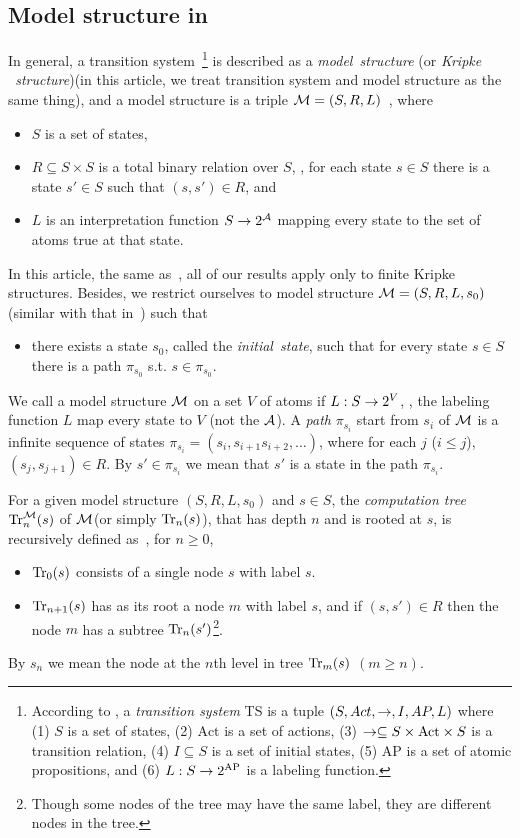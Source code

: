 \documentclass[letterpaper]{article} %
\begin{document}
\subsection{Model structure in \CTL}
 In general, a transition system~\footnote{According to \cite{Baier:PMC:2008},
a {\em transition system} TS is a tuple $(S, Act,\rightarrow,I, AP, L)$ where
(1) $S$ is a set of states,
(2) $\textrm{Act}$ is a set of actions,
(3) $\rightarrow\subseteq S\times \textrm{Act}\times S$ is a transition relation,
(4) $I\subseteq S$ is a set of initial states,
(5) $\textrm{AP}$ is a set of atomic propositions, and
(6) $L:S\rightarrow 2^{\textrm{AP}}$ is a labeling function.} is described as a \emph{model\ structure} (or \emph{Kripke \ structure})(in this article, we treat transition system and model structure as the same thing), and a model structure is a triple ${\cal M}=(S,R,L)$~\cite{emerson1990temporal}, where
\begin{itemize}
  \item $S$ is a set of states,
  \item $R\subseteq S\times S$ is a total binary relation over $S$, \ie, for each state $s\in S$ there is a state $s'\in S$ such that $(s,s')\in R$, and
  \item $L$ is an interpretation function $S\rightarrow 2^{\cal A}$ mapping every state to the set of atoms true at that state.
\end{itemize}
In this article, the same as~\cite{DBLP:journals/tcs/BrowneCG88}, all of our results apply only to finite Kripke structures.
Besides, we restrict ourselves to model structure ${\cal M}=(S,R,L,s_0)$ (similar with that in~\cite{zhang2009refined}) such that
\begin{itemize}
  \item there exists a state $s_0$, called the \emph{initial\ state}, such that for every state $s\in S$ there is a path $\pi_{s_0}$ s.t. $s\in \pi_{s_0}$.
\end{itemize}
We call a model structure ${\cal M}$ on a set $V$ of atoms if $L: S \rightarrow 2^V$, \ie, the labeling function $L$ map every state to $V$ (not the ${\cal A}$).  A \emph{path} $\pi_{s_i}$ start from $s_i$ of ${\cal M}$ is a infinite sequence of states $\pi_{s_i}=(s_i, s_{i+1} s_{i+2},\dots)$, where for each $j$ ($i\leq j$), $(s_j, s_{j+1}) \in R$. By $s'\in \pi_{s_i}$ we mean that $s'$ is a state in the path $\pi_{s_i}$.

For a given model structure $(S,R,L,s_0)$ and $s\in S$,
the {\em computation tree}
$\textrm{Tr}_n^{\cal M}(s)$ of $\cal M$(or simply $\textrm{Tr}_n(s)$), that has depth $n$ and is rooted at $s$, is recursively defined as~\cite{DBLP:journals/tcs/BrowneCG88}, for $n\ge 0$,
\begin{itemize}
  \item $\textrm{Tr}_0(s)$ consists of a single node $s$ with label $s$.
  \item $\textrm{Tr}_{n+1}(s)$ has as its root a node $m$ with label  $s$, and
  if $(s,s')\in R$ then the node $m$ has a subtree $\textrm{Tr}_n(s')$\footnote{Though
  some nodes of the tree may have the same label, they are different nodes in the tree.}.
\end{itemize}
By $s_n$ we mean the node at the $n$th level in tree $\textrm{Tr}_m(s)$ $(m \geq n)$.
\end{document}
